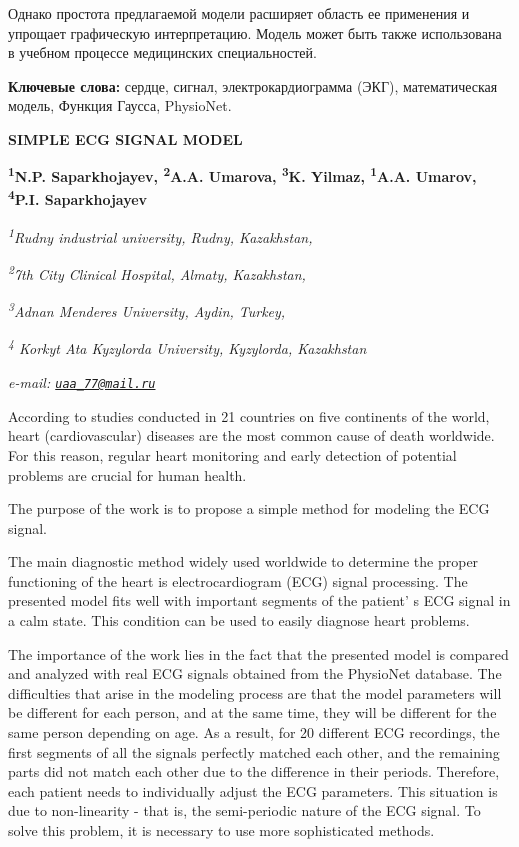 Однако простота предлагаемой модели расширяет область ее применения и
упрощает графическую интерпретацию. Модель может быть также использована
в учебном процессе медицинских специальностей.

{\bfseries Ключевые слова:} сердце, сигнал, электрокардиограмма (ЭКГ),
математическая модель, Функция Гаусса, PhysioNet.

\begin{articleheader}
{\bfseries SIMPLE ECG SIGNAL MODEL}

{\bfseries
\textsuperscript{1}N.P. Saparkhojayev,
\textsuperscript{2}A.A. Umarova,
\textsuperscript{3}K. Yilmaz,
\textsuperscript{1}A.A. Umarov\textsuperscript{\envelope },
\textsuperscript{4}P.I. Saparkhojayev}
\end{articleheader}

\begin{affiliation}
\emph{\textsuperscript{1}Rudny industrial university, Rudny, Kazakhstan,}

\emph{\textsuperscript{2}7th City Clinical Hospital, Almaty, Kazakhstan,}

\emph{\textsuperscript{3}Adnan Menderes University, Aydin, Turkey,}

\emph{\textsuperscript{4} Korkyt Ata Kyzylorda University, Kyzylorda, Kazakhstan}

\emph{e-mail: \href{mailto:uaa_77@mail.ru}{\nolinkurl{uaa\_77@mail.ru}}}
\end{affiliation}

According to studies conducted in 21 countries on five continents of the
world, heart (cardiovascular) diseases are the most common cause of
death worldwide. For this reason, regular heart monitoring and early
detection of potential problems are crucial for human health.

The purpose of the work is to propose a simple method for modeling the
ECG signal.

The main diagnostic method widely used worldwide to determine the proper
functioning of the heart is electrocardiogram (ECG) signal processing.
The presented model fits well with important segments of the
patient' s ECG signal in a calm state. This condition can
be used to easily diagnose heart problems.

The importance of the work lies in the fact that the presented model is
compared and analyzed with real ECG signals obtained from the PhysioNet
database. The difficulties that arise in the modeling process are that
the model parameters will be different for each person, and at the same
time, they will be different for the same person depending on age. As a
result, for 20 different ECG recordings, the first segments of all the
signals perfectly matched each other, and the remaining parts did not
match each other due to the difference in their periods. Therefore, each
patient needs to individually adjust the ECG parameters. This situation
is due to non-linearity - that is, the semi-periodic nature of the ECG
signal. To solve this problem, it is necessary to use more sophisticated
methods.

